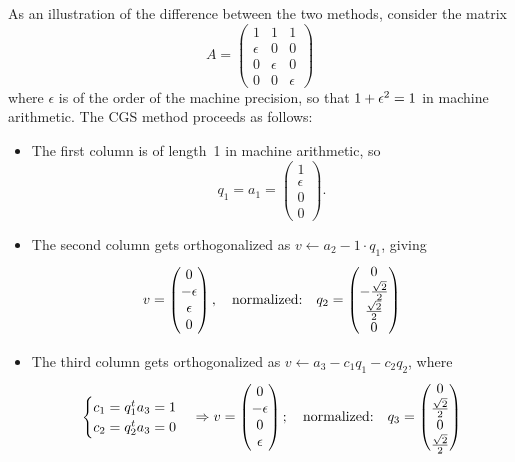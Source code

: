 As an illustration of the difference between the two methods, consider
the matrix
\[ A=
\begin{pmatrix}
  1&1&1\\ \epsilon&0&0\\ 0&\epsilon&0\\ 0&0&\epsilon
\end{pmatrix}
\]
where $\epsilon$ is of the order of the machine precision, so that
$1+\epsilon^2=\nobreak1$ in machine arithmetic.
%
The \ac{CGS} method proceeds as follows:
\begin{itemize}
\item The first column is of length~1 in machine arithmetic, so
  \[ q_1 = a_1 = 
  \begin{pmatrix}
    1\\ \epsilon\\ 0\\ 0
  \end{pmatrix}
  . \]
\item The second column gets orthogonalized as $v\leftarrow a_2-1\cdot
  q_1$, giving
  \[ v=
  \begin{pmatrix}
    0\\ -\epsilon\\ \epsilon\\ 0
  \end{pmatrix},
  \quad\hbox{normalized:}\quad
  q_2 = 
  \begin{pmatrix}
    0\\ -\frac{\sqrt 2}2\\ \frac{\sqrt2}2\\ 0
  \end{pmatrix}
  \]
\item The third column gets orthogonalized as $v\leftarrow
  a_3-c_1q_1-c_2q_2$, where 
  \[ 
  \begin{cases}
    c_1 = q_1^ta_3 = 1\\ c_2 = q_2^ta_3=0
  \end{cases}
  \Rightarrow v=
  \begin{pmatrix}
    0\\ -\epsilon\\ 0\\ \epsilon
  \end{pmatrix};\quad \hbox{normalized:}\quad q_3=
  \begin{pmatrix}
    0\\ \frac{\sqrt2}2\\ 0\\ \frac{\sqrt2}2
  \end{pmatrix}
  \]
\end{itemize}
